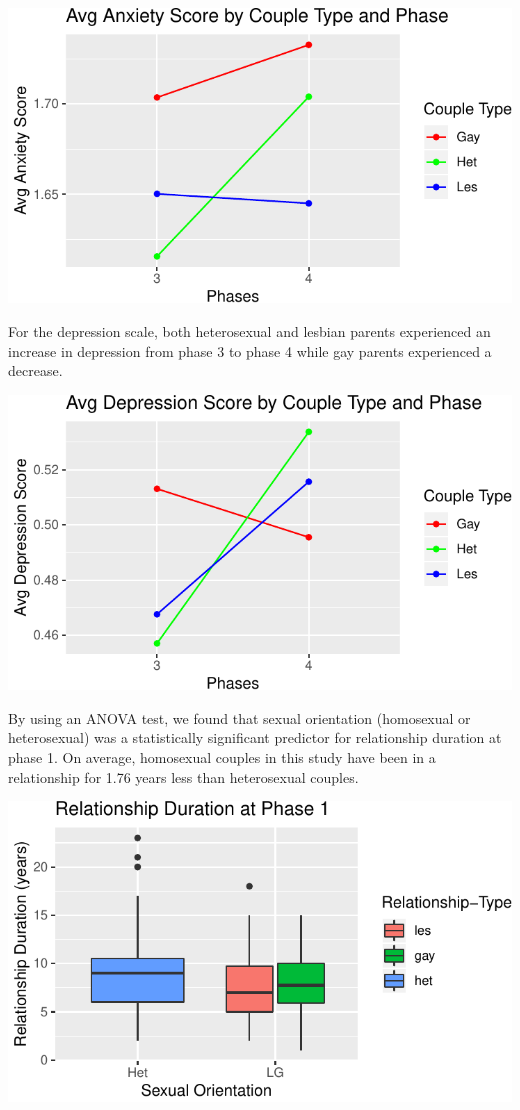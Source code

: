 \documentclass[man]{apa6}
\begin{document}
\includegraphics{final_paper_files/figure-latex/fig3-1.pdf}

For the depression scale, both heterosexual and lesbian parents experienced an increase in depression from phase 3 to phase 4 while gay parents experienced a decrease.

\includegraphics{final_paper_files/figure-latex/fig4-1.pdf}

By using an ANOVA test, we found that sexual orientation (homosexual or heterosexual) was a statistically significant predictor for relationship duration at phase 1. On average, homosexual couples in this study have been in a relationship for 1.76 years less than heterosexual couples.

\includegraphics{final_paper_files/figure-latex/fig5-1.pdf}
\end{document}

